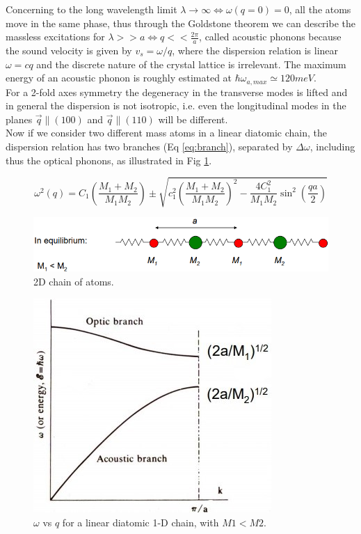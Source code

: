 \documentclass[openany,11pt,a4paper]{report}
\begin{document}
Concerning to the long wavelength limit $ \lambda \rightarrow \infty \Leftrightarrow  \omega (q=0)= 0  $, all the atoms move in the same phase, thus through the Goldstone theorem we can describe the massless excitations for $\lambda >> a  \Leftrightarrow q<< \frac{2 \pi}{a} $, called acoustic phonons because the sound velocity is given by $v_{s}= \omega /q$, where the dispersion relation is linear $\omega = cq$ and the discrete nature of the crystal lattice is irrelevant. The maximum energy of an acoustic phonon is roughly estimated at $ \hbar \omega _{a, max} \simeq 120 meV$.\\


For a 2-fold axes symmetry the degeneracy in the transverse modes is lifted and in general the dispersion is not isotropic, i.e. even the longitudinal modes in the planes $\vec{q} \parallel (100)$ and $\vec{q} \parallel (110)$ will be different.\\
 
 
Now if we consider two different mass atoms in a linear diatomic chain, the dispersion relation has two branches (Eq \ref{eq:branch}), separated by $\Delta \omega$, including thus the optical phonons, as illustrated in Fig \ref{1ddispersion}.


\begin{equation}
\omega^{2}(q)=C_{1}\left(\frac{M_{1}+M_{2}}{M_{1} M_{2}}\right) \pm
\sqrt{c_{1}^{2}\left(\frac{M_{1}+M_{2}}{M_{1} M_{2}}\right)^{2}-\frac{4 C_{1}^{2}}{M_{1} M_{2}} \sin ^{2}\left(\frac{qa}{2} \right)}
\label{eq:branch}
\end{equation}


\begin{figure}[H]
\centering
\includegraphics[scale=0.6]{2Dchain.PNG}
\caption{2D chain of atoms. \cite{phonons}}
\end{figure}




\begin{figure}[H]
\centering
\includegraphics[scale=0.6]{2Ddispersion.jpg}
\caption{ $\omega $ vs $q$ for a linear diatomic 1-D chain, with $M1<M2$. \cite{phonons}}
\label{1ddispersion}
\end{figure}
\end{document}

